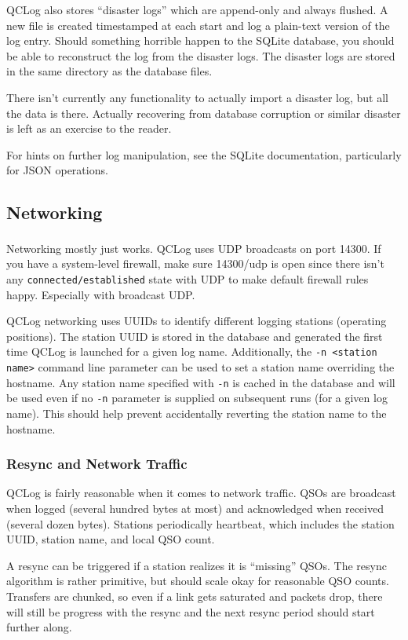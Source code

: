 \documentclass[a4paper,10pt]{article}
\begin{document}
QCLog also stores ``disaster logs'' which are append-only and always flushed. A new file is
created timestamped at each start and log a plain-text version of the log entry. Should 
something horrible happen to the SQLite database, you should be able to reconstruct the
log from the disaster logs. The disaster logs are stored in the same directory as the database
files.

There isn't currently any functionality to actually import a disaster log, but all the data is there.
Actually recovering from database corruption or similar disaster is left as an exercise to the reader.

For hints on further log manipulation,
see the SQLite documentation, particularly for JSON operations.

\subsection{Networking}
Networking mostly just works\textsuperscript{\texttrademark}. QCLog uses UDP broadcasts
on port 14300. If you have a system-level firewall, make sure 14300/udp is open since there
isn't any \texttt{connected/established} state with UDP to make default firewall rules happy.
Especially with broadcast UDP.

QCLog networking uses UUIDs to identify different logging stations (operating positions). The
station UUID is stored in the database and generated the first time QCLog is launched
for a given log name. Additionally, the \texttt{-n <station name>} command line parameter
can be used to set a station name overriding the hostname. Any station name specified with
\texttt{-n} is cached in the database and will be used even if no \texttt{-n} parameter
is supplied on subsequent runs (for a given log name). This should help prevent
accidentally reverting the station name to the hostname.

\subsubsection{Resync and Network Traffic}
QCLog is fairly reasonable when it comes to network traffic. QSOs are broadcast when logged
(several hundred bytes at most) and acknowledged when received (several dozen bytes). Stations
periodically heartbeat, which includes the station UUID, station name, and local QSO count.

A resync can be triggered if a station realizes it is ``missing'' QSOs. The
resync algorithm is rather primitive, but should scale okay for reasonable QSO counts. Transfers
are chunked, so even if a link gets saturated and packets drop, there will still be progress
with the resync and the next resync period should start further along.
\end{document}
